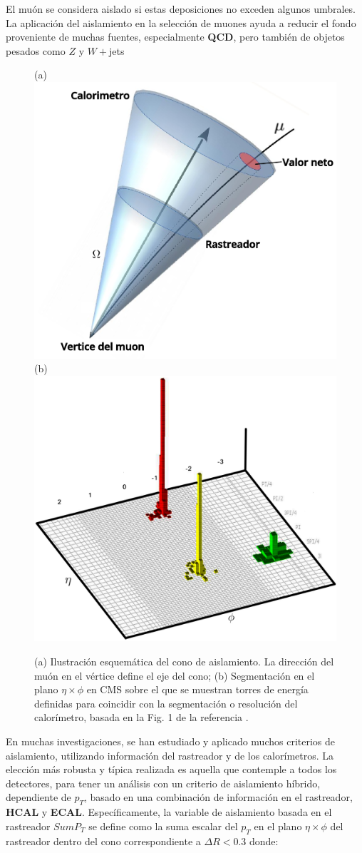 El muón se considera aislado si estas deposiciones no exceden algunos umbrales. La aplicación del aislamiento en la selección de muones ayuda a reducir el fondo proveniente de muchas fuentes, especialmente \textbf{QCD}, pero también de objetos pesados como $Z$ y $W+$jets 
\begin{figure}[!t]
\centering
(a)
\includegraphics[width=.45\textwidth]{Cap2/imagenes/cono_mu.png}
(b)
\includegraphics[width=.45\textwidth]{Cap2/imagenes/plano.png}
\caption{(a) Ilustración esquemática del cono de aislamiento. La dirección del muón en el vértice define el eje del cono; (b) Segmentación en el plano $\eta \times\phi$ en CMS sobre el que se muestran torres de energía definidas para coincidir con la segmentación o resolución del calorímetro, basada en la Fig. 1 de la referencia \cite{tower_1}.}
\label{torre}
\end{figure}
En muchas investigaciones, se han estudiado y aplicado muchos criterios de aislamiento, utilizando información del rastreador y de los calorímetros. La elección más robusta y típica realizada es aquella que contemple a todos los detectores, para tener un análisis con un criterio de aislamiento híbrido, dependiente de $p_T$, basado en una combinación de información en el rastreador, \textbf{HCAL} y \textbf{ECAL}. Específicamente, la variable de aislamiento basada en el rastreador $SumP_T$ se define como la suma escalar del $p_T$ en el plano $\eta \times \phi$ del rastreador dentro del cono correspondiente a $\Delta R<0.3$ donde:
